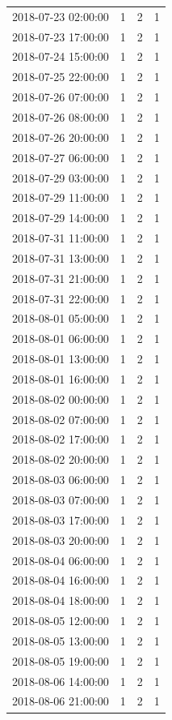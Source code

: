 \begin{tabular}{lrrr}
2018-07-23 02:00:00 & 1 & 2 & 1 \\
2018-07-23 17:00:00 & 1 & 2 & 1 \\
2018-07-24 15:00:00 & 1 & 2 & 1 \\
2018-07-25 22:00:00 & 1 & 2 & 1 \\
2018-07-26 07:00:00 & 1 & 2 & 1 \\
2018-07-26 08:00:00 & 1 & 2 & 1 \\
2018-07-26 20:00:00 & 1 & 2 & 1 \\
2018-07-27 06:00:00 & 1 & 2 & 1 \\
2018-07-29 03:00:00 & 1 & 2 & 1 \\
2018-07-29 11:00:00 & 1 & 2 & 1 \\
2018-07-29 14:00:00 & 1 & 2 & 1 \\
2018-07-31 11:00:00 & 1 & 2 & 1 \\
2018-07-31 13:00:00 & 1 & 2 & 1 \\
2018-07-31 21:00:00 & 1 & 2 & 1 \\
2018-07-31 22:00:00 & 1 & 2 & 1 \\
2018-08-01 05:00:00 & 1 & 2 & 1 \\
2018-08-01 06:00:00 & 1 & 2 & 1 \\
2018-08-01 13:00:00 & 1 & 2 & 1 \\
2018-08-01 16:00:00 & 1 & 2 & 1 \\
2018-08-02 00:00:00 & 1 & 2 & 1 \\
2018-08-02 07:00:00 & 1 & 2 & 1 \\
2018-08-02 17:00:00 & 1 & 2 & 1 \\
2018-08-02 20:00:00 & 1 & 2 & 1 \\
2018-08-03 06:00:00 & 1 & 2 & 1 \\
2018-08-03 07:00:00 & 1 & 2 & 1 \\
2018-08-03 17:00:00 & 1 & 2 & 1 \\
2018-08-03 20:00:00 & 1 & 2 & 1 \\
2018-08-04 06:00:00 & 1 & 2 & 1 \\
2018-08-04 16:00:00 & 1 & 2 & 1 \\
2018-08-04 18:00:00 & 1 & 2 & 1 \\
2018-08-05 12:00:00 & 1 & 2 & 1 \\
2018-08-05 13:00:00 & 1 & 2 & 1 \\
2018-08-05 19:00:00 & 1 & 2 & 1 \\
2018-08-06 14:00:00 & 1 & 2 & 1 \\
2018-08-06 21:00:00 & 1 & 2 & 1 \\

\end{tabular}
